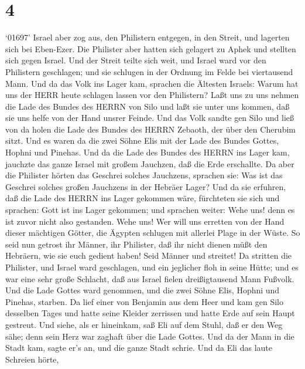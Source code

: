 \hypertarget{section-3}{%
\section{4}\label{section-3}}

 `01697' Israel aber zog aus, den Philistern entgegen, in
den Streit, und lagerten sich bei Eben-Ezer. Die Philister aber hatten
sich gelagert zu Aphek  und stellten sich gegen Israel. Und
der Streit teilte sich weit, und Israel ward vor den Philistern
geschlagen; und sie schlugen in der Ordnung im Felde bei viertausend
Mann.  Und da das Volk ins Lager kam, sprachen die Ältesten
Israels: Warum hat uns der HERR heute schlagen lassen vor den
Philistern? Laßt uns zu uns nehmen die Lade des Bundes des HERRN von
Silo und laßt sie unter uns kommen, daß sie uns helfe von der Hand
unsrer Feinde.  Und das Volk sandte gen Silo und ließ von da
holen die Lade des Bundes des HERRN Zebaoth, der über den Cherubim
sitzt. Und es waren da die zwei Söhne Elis mit der Lade des Bundes
Gottes, Hophni und Pinehas.  Und da die Lade des Bundes des
HERRN ins Lager kam, jauchzte das ganze Israel mit großem Jauchzen, daß
die Erde erschallte.  Da aber die Philister hörten das
Geschrei solches Jauchzens, sprachen sie: Was ist das Geschrei solches
großen Jauchzens in der Hebräer Lager? Und da sie erfuhren, daß die Lade
des HERRN ins Lager gekommen wäre,  fürchteten sie sich und
sprachen: Gott ist ins Lager gekommen; und sprachen weiter: Wehe uns!
denn es ist zuvor nicht also gestanden.  Wehe uns! Wer will
uns erretten von der Hand dieser mächtigen Götter, die Ägypten schlugen
mit allerlei Plage in der Wüste.  So seid nun getrost ihr
Männer, ihr Philister, daß ihr nicht dienen müßt den Hebräern, wie sie
euch gedient haben! Seid Männer und streitet!  Da stritten
die Philister, und Israel ward geschlagen, und ein jeglicher floh in
seine Hütte; und es war eine sehr große Schlacht, daß aus Israel fielen
dreißigtausend Mann Fußvolk.  Und die Lade Gottes ward
genommen, und die zwei Söhne Elis, Hophni und Pinehas, starben.
 Da lief einer von Benjamin aus dem Heer und kam gen Silo
desselben Tages und hatte seine Kleider zerrissen und hatte Erde auf
sein Haupt gestreut.  Und siehe, als er hineinkam, saß Eli
auf dem Stuhl, daß er den Weg sähe; denn sein Herz war zaghaft über die
Lade Gottes. Und da der Mann in die Stadt kam, sagte er's an, und die
ganze Stadt schrie.  Und da Eli das laute Schreien hörte,
